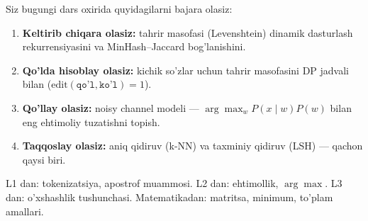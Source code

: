 \documentclass[aspectratio=169,11pt]{beamer}
\begin{document}
\begin{frame}{Siz bugungi dars oxirida quyidagilarni bajara olasiz:}
  \begin{enumerate}\setlength\itemsep{6pt}
    \item \textbf{Keltirib chiqara olasiz:} tahrir masofasi (Levenshtein)
          dinamik dasturlash rekurrensiyasini va MinHash--Jaccard bog'lanishini.
    \item \textbf{Qo'lda hisoblay olasiz:} kichik so'zlar uchun tahrir
          masofasini DP jadvali bilan ($\text{edit}(\texttt{qo'l},\texttt{ko'l})=1$).
    \item \textbf{Qo'llay olasiz:} noisy channel modeli ---
          $\arg\max_w P(x{\mid}w)P(w)$ bilan eng ehtimoliy tuzatishni topish.
    \item \textbf{Taqqoslay olasiz:} aniq qidiruv (k-NN) va taxminiy
          qidiruv (LSH) --- qachon qaysi biri.
  \end{enumerate}
  \vspace{4pt}
  \begin{tcolorbox}[defbox,title=Oldindan talab]
    \footnotesize
    L1 dan: tokenizatsiya, apostrof muammosi. L2 dan: ehtimollik,
    $\arg\max$. L3 dan: o'xshashlik tushunchasi. Matematikadan: matritsa,
    minimum, to'plam amallari.
  \end{tcolorbox}
\end{frame}
\end{document}

